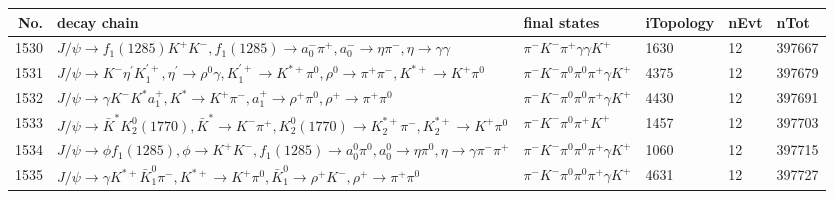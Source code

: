 \begin{table}[htbp] 
\begin{center}
\begin{small}
\begin{tabular}{rlllll}\hline\hline
 No. & decay chain & final states &  iTopology & nEvt & nTot \\\hline
1530&$J/\psi       \rightarrow f_{1}(1285)    K^{+}          K^{-}          , f_{1}(1285)     \rightarrow a_{0}^{-}      \pi^{+}        , a_{0}^{-}       \rightarrow \eta          \pi^{-}        , \eta           \rightarrow \gamma       \gamma       $&$\pi^{-}        K^{-}          \pi^{+}        \gamma       \gamma       K^{+}          $& 1630&   12&397667\\
1531&$J/\psi       \rightarrow K^{-}          \eta^{\prime} K_1^{'+}      , \eta^{\prime}  \rightarrow \rho^{0}      \gamma       , K_1^{'+}       \rightarrow K^{*+}         \pi^{0}        , \rho^{0}       \rightarrow \pi^{+}        \pi^{-}        , K^{*+}          \rightarrow K^{+}          \pi^{0}        $&$\pi^{-}        K^{-}          \pi^{0}        \pi^{0}        \pi^{+}        \gamma       K^{+}          $& 4375&   12&397679\\
1532&$J/\psi       \rightarrow \gamma       K^{-}          K^{*}          a_{1}^{+}      , K^{*}           \rightarrow K^{+}          \pi^{-}        , a_{1}^{+}       \rightarrow \rho^{+}      \pi^{0}        , \rho^{+}       \rightarrow \pi^{+}        \pi^{0}        $&$\pi^{-}        K^{-}          \pi^{0}        \pi^{0}        \pi^{+}        \gamma       K^{+}          $& 4430&   12&397691\\
1533&$J/\psi       \rightarrow \bar{K}^{*}   K_2^0(1770)    , \bar{K}^{*}    \rightarrow K^{-}          \pi^{+}        , K_2^0(1770)     \rightarrow K_2^{*+}       \pi^{-}        , K_2^{*+}        \rightarrow K^{+}          \pi^{0}        $&$\pi^{-}        K^{-}          \pi^{0}        \pi^{+}        K^{+}          $& 1457&   12&397703\\
1534&$J/\psi       \rightarrow \phi           f_{1}(1285)    , \phi            \rightarrow K^{+}          K^{-}          , f_{1}(1285)     \rightarrow a_{0}^{0}      \pi^{0}        , a_{0}^{0}       \rightarrow \eta          \pi^{0}        , \eta           \rightarrow \gamma       \pi^{-}        \pi^{+}        $&$\pi^{-}        K^{-}          \pi^{0}        \pi^{0}        \pi^{+}        \gamma       K^{+}          $& 1060&   12&397715\\
1535&$J/\psi       \rightarrow \gamma       K^{*+}         \bar{K}_1^{0} \pi^{-}        , K^{*+}          \rightarrow K^{+}          \pi^{0}        , \bar{K}_1^{0}  \rightarrow \rho^{+}      K^{-}          , \rho^{+}       \rightarrow \pi^{+}        \pi^{0}        $&$\pi^{-}        K^{-}          \pi^{0}        \pi^{0}        \pi^{+}        \gamma       K^{+}          $& 4631&   12&397727\\

\end{tabular}
\end{small}
\end{center}
\end{table}
